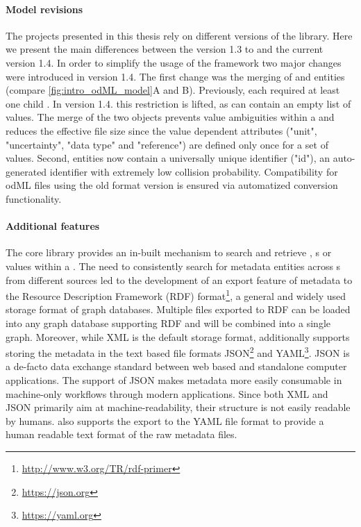 \paragraph{Model revisions}
\label{sec:odml_model_revision}
The projects presented in this thesis rely on different versions of the  library. Here we present the main differences between the  version 1.3 to and the current  version 1.4.
In order to simplify the usage of the  framework two major changes were introduced in  version 1.4. The first change was the merging of  and  entities (compare \ref{fig:intro_odML_model}A and B). Previously, each  required at least one child . In version 1.4. this restriction is lifted, as  can contain an empty list of values. The merge of the two objects prevents value ambiguities within a  and reduces the effective file size since the value dependent attributes ("unit", "uncertainty", "data type" and "reference") are defined only once for a set of values. Second,  entities now contain a universally unique identifier ("id"), an auto-generated identifier with extremely low collision probability. Compatibility for odML files using the old format version is ensured via automatized conversion functionality.

\paragraph{Additional features}
The  core library provides an in-built mechanism to search and retrieve , s or values within a . The need to consistently search for metadata entities across s from different sources led to the development of an export feature of  metadata to the Resource Description Framework (RDF) format\footnote{\url{http://www.w3.org/TR/rdf-primer}}, a general and widely used storage format of graph databases. Multiple  files exported to RDF can be loaded into any graph database supporting RDF and will be combined into a single graph. Moreover, while XML is the default storage format,  additionally supports storing the metadata in the text based file formats JSON\footnote{\url{https://json.org}} and YAML\footnote{\url{https://yaml.org}}. JSON is a de-facto data exchange standard between web based and standalone computer applications. The support of JSON makes  metadata more easily consumable in machine-only workflows through modern applications. Since both XML and JSON primarily aim at machine-readability, their structure is not easily readable by humans.  also supports the export to the YAML file format to provide a human readable text format of the raw metadata files.

